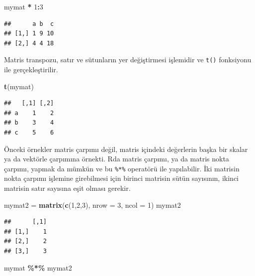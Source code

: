 \documentclass[
]{book}
\newenvironment{Shaded}{\begin{snugshade}}{\end{snugshade}}
\newcommand{\DataTypeTok}[1]{\textcolor[rgb]{0.13,0.29,0.53}{#1}}
\newcommand{\DecValTok}[1]{\textcolor[rgb]{0.00,0.00,0.81}{#1}}
\newcommand{\KeywordTok}[1]{\textcolor[rgb]{0.13,0.29,0.53}{\textbf{#1}}}
\newcommand{\NormalTok}[1]{#1}
\newcommand{\OperatorTok}[1]{\textcolor[rgb]{0.81,0.36,0.00}{\textbf{#1}}}
\newcommand{\StringTok}[1]{\textcolor[rgb]{0.31,0.60,0.02}{#1}}
\begin{document}
\begin{Shaded}
\begin{Highlighting}[]
\NormalTok{mymat }\OperatorTok{*}\StringTok{ }\DecValTok{1}\OperatorTok{:}\DecValTok{3}
\end{Highlighting}
\end{Shaded}

\begin{verbatim}
##      a b  c
## [1,] 1 9 10
## [2,] 4 4 18
\end{verbatim}

Matris transpozu, satır ve sütunların yer değiştirmesi işlemidir ve \texttt{t()} fonksiyonu ile gerçekleştirilir.

\begin{Shaded}
\begin{Highlighting}[]
\KeywordTok{t}\NormalTok{(mymat)}
\end{Highlighting}
\end{Shaded}

\begin{verbatim}
##   [,1] [,2]
## a    1    2
## b    3    4
## c    5    6
\end{verbatim}

Önceki örnekler matris çarpımı değil, matris içindeki değerlerin başka bir skalar ya da vektörle çarpımına örnekti. Rda matris çarpımı, ya da matris nokta çarpımı, yapmak da mümkün ve bu \texttt{\%*\%} operatörü ile yapılabilir. İki matrisin nokta çarpımı işlemine girebilmesi için birinci matrisin sütün sayısının, ikinci matrisin satır sayısına eşit olması gerekir.

\begin{Shaded}
\begin{Highlighting}[]
\NormalTok{mymat2 =}\StringTok{ }\KeywordTok{matrix}\NormalTok{(}\KeywordTok{c}\NormalTok{(}\DecValTok{1}\NormalTok{,}\DecValTok{2}\NormalTok{,}\DecValTok{3}\NormalTok{), }\DataTypeTok{nrow =} \DecValTok{3}\NormalTok{, }\DataTypeTok{ncol =} \DecValTok{1}\NormalTok{)}
\NormalTok{mymat2}
\end{Highlighting}
\end{Shaded}

\begin{verbatim}
##      [,1]
## [1,]    1
## [2,]    2
## [3,]    3
\end{verbatim}

\begin{Shaded}
\begin{Highlighting}[]
\NormalTok{mymat }\OperatorTok{\%*\%}\StringTok{ }\NormalTok{mymat2}
\end{Highlighting}
\end{Shaded}
\end{document}
